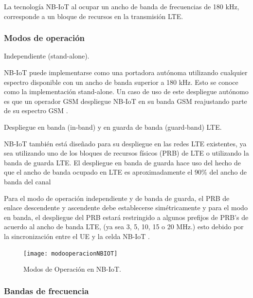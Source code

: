 La tecnología NB-IoT al ocupar un ancho de banda de frecuencias de 180 kHz, corresponde a un bloque de recursos en la transmisión LTE. \newline

\subsubsection{Modos de operación}

Independiente (stand-alone).\newline

NB-IoT puede implementarse como una portadora autónoma utilizando cualquier espectro disponible con un ancho de banda superior a 180 kHz. Esto se conoce como la implementación stand-alone. Un caso de uso de este despliegue autónomo es que un operador GSM despliegue NB-IoT en su banda GSM reajustando parte de su espectro GSM \parencite{Liberg2018}.\newline

Despliegue en banda (in-band) y en guarda de banda (guard-band) LTE.\newline

NB-IoT también está diseñado para su despliegue en las redes LTE existentes, ya sea utilizando uno de los bloques de recursos físicos (PRB) de LTE o utilizando la banda de guarda LTE. El despliegue en banda de guarda hace uso del hecho de que el ancho de banda ocupado en LTE es aproximadamente el $90\%$ del ancho de banda del canal\newline

Para el modo de operación independiente y de banda de guarda, el PRB de enlace descendente y ascendente debe establecerse simétricamente y para el modo en banda, el despliegue del PRB estará restringido a algunos prefijos de PRB’s de acuerdo al ancho de banda LTE, (ya sea 3, 5, 10, 15 o 20 MHz.) esto debido por la sincronización entre el UE y la celda NB-IoT \parencite{NBIoTDeploymentGSMA}.\newline

\begin{figure}[th]
    \centering
    \texttt{[image: modooperacionNBIOT]}
    \decoRule
    \caption[Modos de Operación en NB-IoT.]{Modos de Operación en NB-IoT. \parencite{Liberg2018}}
    \label{fig:NBIoT2}
\end{figure}

\subsubsection{Bandas de frecuencia}

